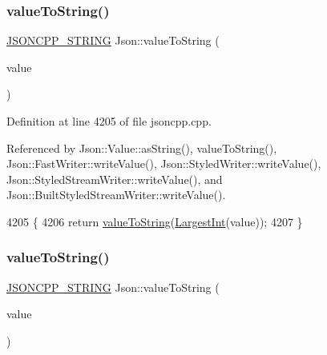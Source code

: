 \subsubsection{\texorpdfstring{value\+To\+String()}{valueToString()}\hspace{0.1cm}{\footnotesize\ttfamily [1/6]}}
{\footnotesize\ttfamily \hyperlink{json_8h_a1e723f95759de062585bc4a8fd3fa4be}{J\+S\+O\+N\+C\+P\+P\+\_\+\+S\+T\+R\+I\+NG} Json\+::value\+To\+String (\begin{DoxyParamCaption}\item[{\hyperlink{namespace_json_a08122e8005b706d982e48cca1e2119c7}{Int}}]{value }\end{DoxyParamCaption})}



Definition at line 4205 of file jsoncpp.\+cpp.



Referenced by Json\+::\+Value\+::as\+String(), value\+To\+String(), Json\+::\+Fast\+Writer\+::write\+Value(), Json\+::\+Styled\+Writer\+::write\+Value(), Json\+::\+Styled\+Stream\+Writer\+::write\+Value(), and Json\+::\+Built\+Styled\+Stream\+Writer\+::write\+Value().


\begin{DoxyCode}
4205                                         \{
4206   \textcolor{keywordflow}{return} \hyperlink{namespace_json_a498503e8f49d6a3811e3c9f6757da60d}{valueToString}(\hyperlink{namespace_json_a218d880af853ce786cd985e82571d297}{LargestInt}(value));
4207 \}
\end{DoxyCode}
\mbox{\label{namespace_json_ab2cb54f173193c8d27c3eb7f10b6e79a}} 
\subsubsection{\texorpdfstring{value\+To\+String()}{valueToString()}\hspace{0.1cm}{\footnotesize\ttfamily [2/6]}}
{\footnotesize\ttfamily \hyperlink{json_8h_a1e723f95759de062585bc4a8fd3fa4be}{J\+S\+O\+N\+C\+P\+P\+\_\+\+S\+T\+R\+I\+NG} Json\+::value\+To\+String (\begin{DoxyParamCaption}\item[{\hyperlink{namespace_json_a800fb90eb6ee8d5d62b600c06f87f7d4}{U\+Int}}]{value }\end{DoxyParamCaption})}



